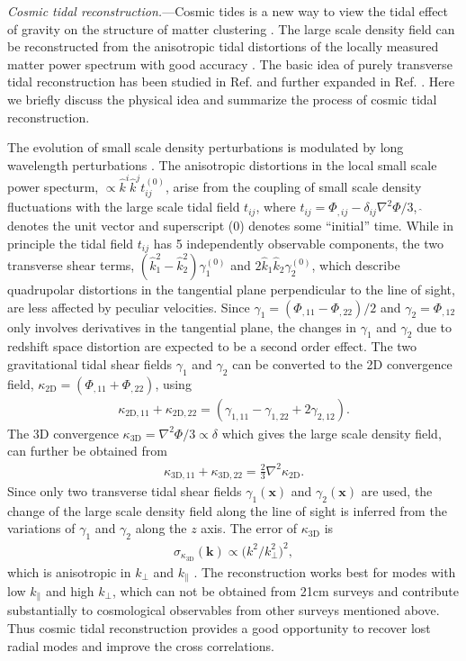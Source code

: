 \documentclass[aps,prl,twocolumn,showpacs,superscriptaddress,groupedaddress,nofootinbib]{revtex4}  %
\newcommand{\mr}{\mathrm}
\begin{document}
{\it Cosmic tidal reconstruction.}---Cosmic tides is a new way to view the
tidal effect of gravity on the structure of matter clustering \cite{2012:pen}.
The large scale density field can be reconstructed from the anisotropic tidal 
distortions of the locally measured matter power spectrum with good
accuracy \cite{2012:pen}\cite{2015:zhu}.
The basic idea of purely transverse tidal reconstruction has been studied in
Ref. \cite{2012:pen} and further expanded in Ref. \cite{2015:zhu}.
Here we briefly discuss the physical idea and summarize the process of cosmic
tidal reconstruction. 

The evolution of small scale density perturbations is modulated by long 
wavelength perturbations \cite{2014:tidal}. 
The anisotropic distortions in the local small scale power specturm,
$\propto\hat{k}^i\hat{k}^jt_{ij}^{(0)}$, arise from the coupling of small scale
density fluctuations with the large scale tidal field $t_{ij}$, where 
$t_{ij}=\Phi_{,ij}-\delta_{ij}\nabla^2\Phi/3$, $\hat{\ }$ denotes the 
unit vector and superscript (0) denotes some ``initial'' time. 
While in principle the tidal field $t_{ij}$ has 5 independently observable
components, the two transverse shear terms, 
$(\hat{k}^2_1-\hat{k}^2_2)\gamma_1^{(0)}$ and 
$2\hat{k}_1\hat{k}_2\gamma_2^{(0)}$, 
which describe quadrupolar distortions in the tangential plane perpendicular
to the line of sight, are less affected by peculiar velocities.
Since $\gamma_1=(\Phi_{,11}-\Phi_{,22})/2$ and $\gamma_2=\Phi_{,12}$
only involves derivatives in the tangential plane, the changes in $\gamma_1$
and $\gamma_2$ due to redshift space distortion are expected to be a second
order effect. The two gravitational tidal shear fields $\gamma_1$ and $\gamma_2$
can be converted to the 2D convergence field, 
$\kappa_\mr{2D}=(\Phi_{,11}+\Phi_{,22})$, using
\begin{eqnarray}
\label{eq:kappa2d}
\kappa_{\mr{2D},11}+\kappa_{\mr{2D},22}=
(\gamma_{1,11}-\gamma_{1,22}+2\gamma_{2,12}).
\end{eqnarray}
The 3D convergence $\kappa_\mr{3D}=\nabla^2\Phi/3\propto\delta$ which gives
the large scale density field, can further be obtained from
\begin{eqnarray}
\label{eq:kappa3d}
\kappa_{\mr{3D},11}+\kappa_{\mr{3D},22}=\frac{2}{3}\nabla^2\kappa_\mr{2D}.
\end{eqnarray}
Since only two transverse tidal shear fields $\gamma_1(\bm{x})$ and 
$\gamma_2(\bm{x})$ are used, the change of the large scale density field along
the line of sight is inferred from the variations of $\gamma_1$ and $\gamma_2$
along the $z$ axis. The error of $\kappa_\mr{3D}$ is 
\begin{eqnarray}
\sigma_{\kappa_\mr{3D}}(\bm{k})\propto\big({k^2}/{k_\perp^2}\big)^2,
\end{eqnarray}
which is anisotropic in $k_\perp$ and $k_\parallel$ \cite{2015:zhu}.
The reconstruction works best for modes with low $k_\parallel$ and high 
$k_\perp$, which can not be obtained from 21cm surveys and contribute 
substantially to cosmological observables from other surveys mentioned above.
Thus cosmic tidal reconstruction provides a good opportunity to recover lost 
radial modes and improve the cross correlations.
\end{document}
